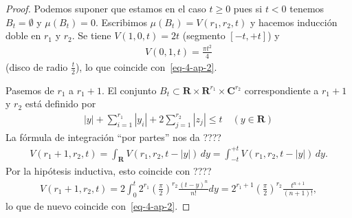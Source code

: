\documentclass[10pt,oneside,bibtotoc,smallheadings,leqno,a5paper,DIV=12]{scrbook}
\newcommand{\RR}{\mathbf{R}}
\newcommand{\CC}{\mathbf{C}}
\newcommand{\abs}[1]{\left\lvert#1\right\rvert}
\numberwithin{equation}{section}
\theoremstyle{defi}
\theoremstyle{enonce}
\theoremstyle{rem}
\numberwithin{theorem}{section}
\numberwithin{proposition}{section}
\numberwithin{definition}{section}
\numberwithin{lemma}{section}
\numberwithin{corollary}{section}
\numberwithin{example}{section}
\numberwithin{footnote}{section}%
\begin{document}
\begin{proof}
Podemos suponer que estamos en el caso $t\geq 0$ pues si $t < 0$ tenemos $B_{t}=\emptyset$ y $\mu(B_{t})=0$.
Escribimos $\mu(B_{t}) = V(r_{1},r_{2},t)$ y hacemos inducci\'on doble en $r_{1}$ y $r_{2}$. Se tiene
$V(1,0,t) = 2t$ (segmento $[-t,+t]$) y
\begin{gather*}
V(0,1,t)=\frac{\pi t^{2}}{4}
\end{gather*}
(disco de radio $\frac{t}{2}$), lo que coincide con~\eqref{eq-4-ap-2}.

Pasemos de $r_{1}$ a $r_{1}+1$. El conjunto $B_{t}\subset\RR\times\RR^{r_{1}}\times\CC^{r_{2}}$ correspondiente
a $r_{1}+1$ y $r_{2}$ est\'a definido por
\begin{gather*}
\abs{y}+\sum_{i=1}^{r_{1}}\abs{y_{i}}+2\sum_{j=1}^{r_{2}}\abs{z_{j}}\leq t\quad(y\in\RR)
\end{gather*}
La f\'ormula de integraci\'on ``por partes'' nos da ????
\begin{gather*}
V(r_{1}+1,r_{2},t) = \int_{\RR}V(r_{1},r_{2},t-\abs{y})\,dy=\int_{-t}^{+t}V(r_{1},r_{2},t-\abs{y})\,dy.
\end{gather*}
Por la hip\'otesis inductiva, esto coincide con ????
\begin{gather*}
V(r_{1}+1,r_{2},t) = 2\int_{0}^{t}2^{r_{1}}\left(\frac{\pi}{2}\right)^{r_{2}}\frac{(t-y)^{n}}{n!}dy
=2^{r_{1}+1}\left(\frac{\pi}{2}\right)^{r_{2}}\frac{t^{n+1}}{(n+1)!},
\end{gather*}
lo que de nuevo coincide con~\eqref{eq-4-ap-2}.


\end{proof}
\end{document}
